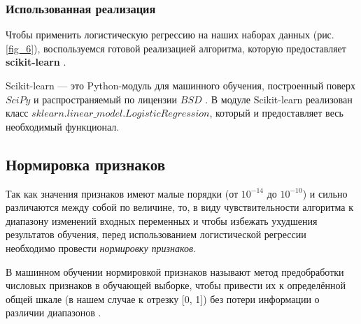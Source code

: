\newpage
\subsubsection{Использованная реализация}

Чтобы применить логистическую регрессию на наших наборах данных (рис. \ref{fig_6}), 
воспользуемся готовой реализацией алгоритма, которую предоставляет \textbf{scikit-learn} \cite{scikit-learn}.

Scikit-learn --- это Python-модуль для машинного обучения, построенный поверх $SciPy$
\cite{scipy} и распространяемый по лицензии $BSD$ \cite{BSD}.
В модуле Scikit-learn реализован класс $sklearn.linear\_model.LogisticRegression$, который и
предоставляет весь необходимый функционал.

\subsection{Нормировка признаков}

\vspace*{5 mm}


Так как значения признаков имеют малые порядки (от $10^{-14}$ до $10^{-10}$) и сильно
различаются между собой по величине, то, в виду чувствительности алгоритма
к диапазону изменений входных переменных и чтобы избежать ухудшения результатов обучения,
перед использованием логистической регрессии необходимо провести
\textit{нормировку признаков.}


В машинном обучении нормировкой признаков называют метод предобработки числовых признаков
в обучающей выборке, чтобы привести их к определённой общей шкале (в нашем случае
к отрезку [0, 1]) без потери информации о различии диапазонов \cite{ML_lectures}.

